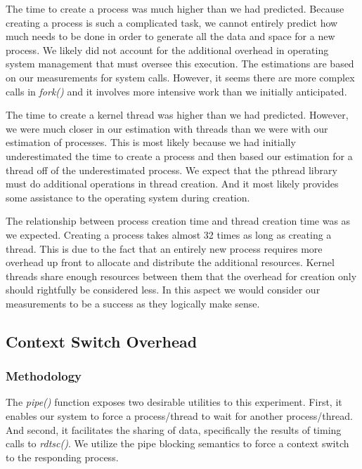 \documentclass[sigconf]{acmart}
\begin{document}
The time to create a process was much higher than we had predicted. Because creating a process is such a complicated task, we cannot entirely predict how much needs to be done in order to generate all the data and space for a new process. We likely did not account for the additional overhead in operating system management that must oversee this execution. The estimations are based on our measurements for system calls. However, it seems there are more complex calls in \textit{fork()} and it involves more intensive work than we initially anticipated.

The time to create a kernel thread was higher than we had predicted. However, we were much closer in our estimation with threads than we were with our estimation of processes. This is most likely because we had initially underestimated the time to create a process and then based our estimation for a thread off of the underestimated process. We expect that the pthread library must do additional operations in thread creation. And it most likely provides some assistance to the operating system during creation.

The relationship between process creation time and thread creation time was as we expected. Creating a process takes almost 32 times as long as creating a thread. This is due to the fact that an entirely new process requires more overhead up front to allocate and distribute the additional resources. Kernel threads share enough resources between them that the overhead for creation only should rightfully be considered less. In this aspect we would consider our measurements to be a success as they logically make sense.

\subsection{Context Switch Overhead}
\subsubsection{Methodology}
The \textit{pipe()} function exposes two desirable utilities to this experiment. First, it enables our system to force a process/thread to wait for another process/thread. And second, it facilitates the sharing of data, specifically the results of timing calls to \textit{rdtsc()}. We utilize the pipe blocking semantics to force a context switch to the responding process.
\end{document}
